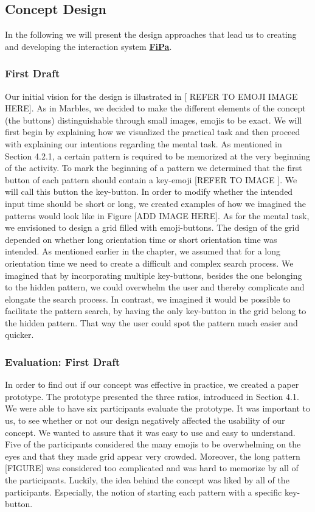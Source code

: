 \subsection{Concept Design}
In the following we will present the design approaches that lead us to creating and developing the interaction system \underline{\textbf{FiPa}}.

\subsubsection{First Draft}
Our initial vision for the design is illustrated in [ REFER TO EMOJI IMAGE HERE]. As in Marbles, we decided to make the different elements of the concept (the buttons) distinguishable through small images, emojis to be exact. We will first begin by explaining how we visualized the practical task and then proceed with explaining our intentions regarding the mental task. As mentioned in Section 4.2.1, a certain pattern is required to be memorized at the very beginning of the activity. To mark the beginning of a pattern we determined that the first button of each pattern should contain a key-emoji [REFER TO IMAGE ]. We will call this button the key-button. In order to modify whether the intended input time should be short or long, we created examples of how we imagined the patterns would look like in Figure [ADD IMAGE HERE]. As for the mental task, we envisioned to design a grid filled with emoji-buttons. The design of the grid depended on whether long orientation time or short orientation time was intended. As mentioned earlier in the chapter, we assumed that for a long orientation time we need to create a difficult and complex search process. We imagined that by incorporating multiple key-buttons, besides the one belonging to the hidden pattern, we could overwhelm the user and thereby complicate and elongate the search process. In contrast, we imagined it would be possible to facilitate the pattern search, by having the only key-button in the grid belong to the hidden pattern. That way the user could spot the pattern much easier and quicker.

\subsubsection{Evaluation: First Draft}
In order to find out if our concept was effective in practice, we created a paper prototype. The prototype presented the three ratios, introduced in Section 4.1. We were able to have six participants evaluate the prototype. It was important to us, to see whether or not our design negatively affected the usability of our concept. We wanted to assure that it was easy to use and easy to understand.
Five of the participants considered the many emojis to be overwhelming on the eyes and that they made grid appear very crowded. Moreover, the long pattern [FIGURE] was considered too complicated and was hard to memorize by all of the participants. 
Luckily, the idea behind the concept was liked by all of the participants. Especially, the notion of starting each pattern with a specific key-button. \\

